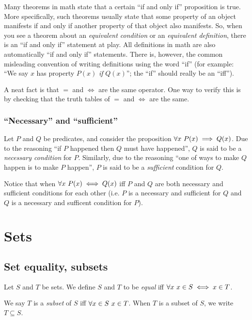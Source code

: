 Many theorems in math state that a certain ``if and only if'' proposition is true. More specifically, such theorems usually state that some property of an object manifests if and only if another property of that object also manifests. So, when you see a theorem about an \textit{equivalent condition} or an \textit{equivalent definition}, there is an ``if and only if'' statement at play. All definitions in math are also automatically ``if and only if'' statements. There is, however, the common misleading convention of writing definitions using the word ``if'' (for example: ``We say $x$ has property $P(x)$ \textit{if} $Q(x)$''; the ``if'' should really be an ``iff'').

A neat fact is that $=$ and $\iff$ are the same operator. One way to verify this is by checking that the truth tables of $=$ and $\iff$ are the same.

\subsubsection*{``Necessary'' and ``sufficient''}

Let $P$ and $Q$ be predicates, and consider the proposition $\forall x \text{ } P(x) \implies Q(x)$. Due to the reasoning ``if $P$ happened then $Q$ must have happened'', $Q$ is said to be a \textit{necessary condition} for $P$. Similarly, due to the reasoning ``one of ways to make $Q$ happen is to make $P$ happen'', $P$ is said to be a \textit{sufficient} condition for $Q$. 

Notice that when $\forall x \text{ } P(x) \iff Q(x)$ iff $P$ and $Q$ are both necessary and sufficient conditions for each other (i.e. $P$ is a necessary and sufficient for $Q$ and $Q$ is a necessary and sufficent condition for $P$).

\newpage

\section{Sets}

\subsection*{Set equality, subsets}

Let $S$ and $T$ be sets. We define $S$ and $T$ to be \textit{equal} iff $\forall x \text{ } x \in S \iff x \in T$.

We say $T$ is a \textit{subset} of $S$ iff $\forall x \in S \text{ } x \in T$. When $T$ is a subset of $S$, we write $T \subseteq S$. 


